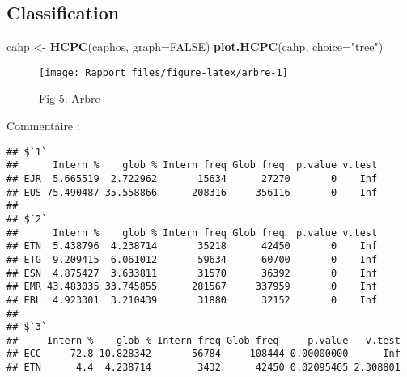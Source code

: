 \documentclass[
]{article}
\newenvironment{Shaded}{\begin{snugshade}}{\end{snugshade}}
\newcommand{\AttributeTok}[1]{\textcolor[rgb]{0.13,0.29,0.53}{#1}}
\newcommand{\ConstantTok}[1]{\textcolor[rgb]{0.56,0.35,0.01}{#1}}
\newcommand{\ControlFlowTok}[1]{\textcolor[rgb]{0.13,0.29,0.53}{\textbf{#1}}}
\newcommand{\DecValTok}[1]{\textcolor[rgb]{0.00,0.00,0.81}{#1}}
\newcommand{\FunctionTok}[1]{\textcolor[rgb]{0.13,0.29,0.53}{\textbf{#1}}}
\newcommand{\NormalTok}[1]{#1}
\newcommand{\OtherTok}[1]{\textcolor[rgb]{0.56,0.35,0.01}{#1}}
\newcommand{\SpecialCharTok}[1]{\textcolor[rgb]{0.81,0.36,0.00}{\textbf{#1}}}
\newcommand{\StringTok}[1]{\textcolor[rgb]{0.31,0.60,0.02}{#1}}
\begin{document}
\begin{Shaded}
\end{Shaded}

\subsection{Classification}\label{classification}

\begin{Shaded}
\begin{Highlighting}[]
\NormalTok{cahp }\OtherTok{\textless{}{-}} \FunctionTok{HCPC}\NormalTok{(caphos, }\AttributeTok{graph=}\ConstantTok{FALSE}\NormalTok{)}
\FunctionTok{plot.HCPC}\NormalTok{(cahp, }\AttributeTok{choice=}\StringTok{"tree"}\NormalTok{)}
\end{Highlighting}
\end{Shaded}

\begin{figure}

{\centering \texttt{[image: Rapport\_files/figure-latex/arbre-1]} 

}

\caption{Fig 5: Arbre}\label{fig:arbre}
\end{figure}

Commentaire :

\begin{Shaded}
\end{Shaded}

\begin{verbatim}
## $`1`
##      Intern %    glob % Intern freq Glob freq  p.value v.test
## EJR  5.665519  2.722962       15634      27270       0    Inf
## EUS 75.490487 35.558866      208316     356116       0    Inf
## 
## $`2`
##      Intern %    glob % Intern freq Glob freq  p.value v.test
## ETN  5.438796  4.238714       35218      42450       0    Inf
## ETG  9.209415  6.061012       59634      60700       0    Inf
## ESN  4.875427  3.633811       31570      36392       0    Inf
## EMR 43.483035 33.745855      281567     337959       0    Inf
## EBL  4.923301  3.210439       31880      32152       0    Inf
## 
## $`3`
##     Intern %    glob % Intern freq Glob freq     p.value   v.test
## ECC     72.8 10.828342       56784     108444 0.00000000      Inf
## ETN      4.4  4.238714        3432      42450 0.02095465 2.308801
\end{verbatim}
\end{document}
